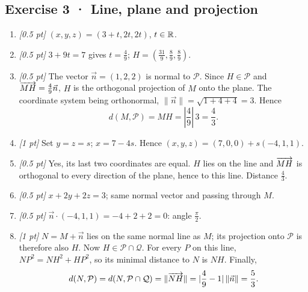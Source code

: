 \subsection*{Exercise 3 · Line, plane and projection}\begin{enumerate}

\item \textit{[0.5 pt]} $(x,y,z)=(3+t,2t,2t)$, $t\in\mathbb R$.

\item \textit{[0.5 pt]} $3+9t=7$ gives $t=\frac{4}{9}$; $H=(\frac{31}{9},\frac{8}{9},\frac{8}{9})$.

\item \textit{[0.5 pt]} The vector $\vec n=(1,2,2)$ is normal to $\mathcal P$. Since $H\in\mathcal P$ and $\overrightarrow{MH}=\frac{4}{9}\vec n$, $H$ is the orthogonal projection of $M$ onto the plane. The coordinate system being orthonormal, $\|\vec n\|=\sqrt{1+4+4}=3$. Hence
\[d(M,\mathcal P)=MH=|\frac{4}{9}|\,3=\frac{4}{3}.\]

\item \textit{[1 pt]} Set $y=z=s$; $x=7-4s$. Hence $(x,y,z)=(7,0,0)+s(-4,1,1)$.

\item \textit{[0.5 pt]} Yes, its last two coordinates are equal. $H$ lies on the line and $\overrightarrow{MH}$ is orthogonal to every direction of the plane, hence to this line. Distance $\frac{4}{3}$.

\item \textit{[0.5 pt]} $x+2y+2z=3$; same normal vector and passing through $M$.

\item \textit{[0.5 pt]} $\vec n\cdot(-4,1,1)=-4+2+2=0$: angle $\frac{\pi}{2}$.

\item \textit{[1 pt]} $N=M+\vec n$ lies on the same normal line as $M$; its projection onto $\mathcal P$ is therefore also $H$. Now $H\in\mathcal P\cap\mathcal Q$. For every $P$ on this line, $NP^2=NH^2+HP^2$, so its minimal distance to $N$ is $NH$. Finally,
\[d(N,\mathcal P)=d(N,\mathcal P\cap\mathcal Q)=\|\overrightarrow{NH}\|=|\frac{4}{9}-1|\,\|\vec n\|=\frac{5}{3}.\]

\end{enumerate}

